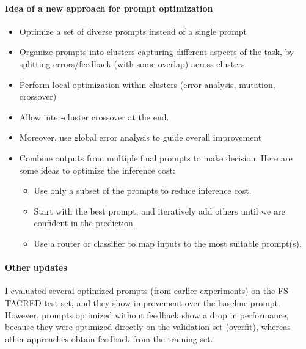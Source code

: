 \documentclass[12pt]{article}
\begin{document}
\paragraph{Idea of a new approach for prompt optimization}
\begin{itemize}
    \item Optimize a {set of diverse prompts} instead of a single prompt
    \item Organize prompts into {clusters} capturing different aspects of the task, by splitting errors/feedback (with some overlap) across clusters.
    \item Perform {local optimization} within clusters (error analysis, mutation, crossover)
    \item Allow inter-cluster crossover at the end.
    \item Moreover, use {global error analysis} to guide overall improvement
    \item Combine outputs from multiple final prompts to make decision. Here are some ideas to optimize the inference cost:
    \begin{itemize}
        \item Use only a {subset of the prompts} to reduce inference cost.
        \item Start with the {best prompt}, and iteratively add others until we are confident in the prediction.
        \item Use a {router or classifier} to map inputs to the most suitable prompt(s).
    \end{itemize}
\end{itemize}


\paragraph{Other updates}
I evaluated several optimized prompts (from earlier experiments) on the FS-TACRED test set, 
and they show improvement over the baseline prompt. 
However, prompts optimized without feedback show a drop in performance,
because they were optimized directly on the validation set (overfit), whereas other approaches obtain feedback from the training set.

%   
%     
\end{document}
